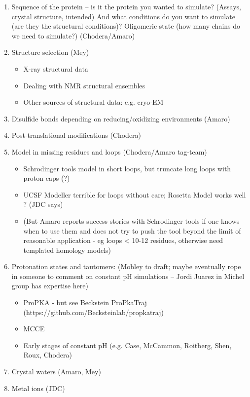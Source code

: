 \documentclass[9pt]{livecoms}
\begin{document}
\begin{enumerate}
\item Sequence of the protein -- is it the protein you wanted to simulate? (Assays, crystal structure, intended) And what conditions do you want to simulate (are they the structural conditions)? Oligomeric state (how many chains do we need to simulate?) (Chodera/Amaro)
\item Structure selection (Mey) 
    \begin{itemize}
    \item  X-ray structural data
    \item Dealing with NMR structural ensembles
    \item Other sources of structural data: e.g. cryo-EM
    \end{itemize}
\item Disulfide bonds depending on reducing/oxidizing environments (Amaro)
\item Post-translational modifications (Chodera)
\item Model in missing residues and loops (Chodera/Amaro tag-team)
    \begin{itemize}
    \item Schrodinger tools model in short loops, but truncate long loops with proton caps (?)
    \item UCSF Modeller terrible for loops without care; Rosetta Model works well ? (JDC says)
    \item (But Amaro reports success stories with Schrodinger tools if one knows when to use them and does not try to push the tool beyond the limit of reasonable application - eg loops < 10-12 residues, otherwise need templated homology models)
    \end{itemize}
\item Protonation states and tautomers: (Mobley to draft; maybe eventually rope in someone to comment on constant pH simulations -- Jordi Juarez in Michel group has expertise here)
    \begin{itemize}
    \item ProPKA - but see Beckstein ProPkaTraj (https://github.com/Becksteinlab/propkatraj)
    \item MCCE
    \item Early stages of constant pH (e.g. Case, McCammon, Roitberg, Shen, Roux, Chodera)
    \end{itemize}
\item Crystal waters (Amaro, Mey)
\item Metal ions (JDC)


\end{enumerate}
\end{document}
